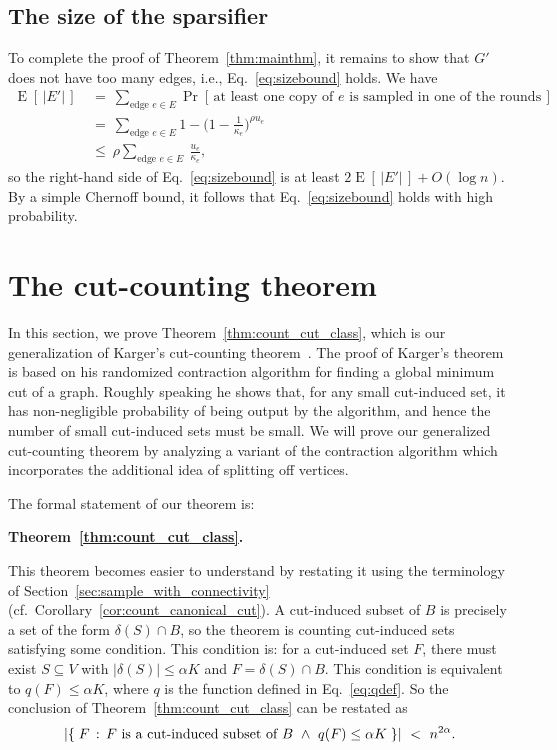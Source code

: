 \documentclass[11pt]{article}
\numberwithin{equation}{section}
\newcommand{\intersect}{\cap}
\newcommand{\abs}[1]{\lvert #1 \rvert}
\newcommand{\card}[1]{\abs{#1}}
\newcommand{\prob}[1]{\operatorname{Pr}\left[\,#1\,\right]}               \newcommand{\probg}[2]{\operatorname{Pr}\left[\,#1 \:\mid\: #2\,\right]}
\newcommand{\expect}[1]{\operatorname{E}\left[\,#1\,\right]}              \newcommand{\expectg}[2]{\operatorname{E}\left[\,#1 \,\mid\, #2\,\right]}
\newcommand{\Corollary}[1]{Corollary~\ref{cor:#1}}
\newcommand{\Equation}[1]{Eq.~\eqref{eq:#1}}
\newcommand{\SectionName}[1]{\label{sec:#1}}
\newcommand{\Section}[1]{Section~\ref{sec:#1}}
\newcommand{\Theorem}[1]{Theorem~\ref{thm:#1}}
\begin{document}
\subsection{The size of the sparsifier}

To complete the proof of \Theorem{mainthm},
it remains to show that $G'$ does not have too many edges,
i.e., \Equation{sizebound} holds.
We have
\begin{align*}
\expect{ \card{E'} }
    &~=~ \sum_{\text{edge } e \in E}
        \prob{ \text{at least one copy of $e$ is sampled in one of the rounds} } \\
    &~=~ \sum_{\text{edge } e \in E} 1 - \Big( 1 - \frac{1}{\kappa_e} \Big)^{\rho u_e} \\
    &~\leq~ \rho \sum_{\text{edge } e \in E} \: \frac{u_e}{\kappa_e},
\end{align*}
so the right-hand side of \Equation{sizebound} is at least $2 \expect{ \card{E'} } + O(\log n)$.
By a simple Chernoff bound, it follows that \Equation{sizebound} holds with high probability.




\section{The cut-counting theorem}
\SectionName{splitting_off_alg}

In this section, we prove \Theorem{count_cut_class}, which is our
generalization of Karger's cut-counting theorem~\cite{KargerContract,KargerStein}.
The proof of Karger's theorem is based on his randomized contraction algorithm for
finding a global minimum cut of a graph.
Roughly speaking he shows that, for any small cut-induced set, it has non-negligible probability
of being output by the algorithm, and hence the number of small cut-induced sets must be small.
We will prove our generalized cut-counting theorem by analyzing a variant of the contraction
algorithm which incorporates the additional idea of splitting off vertices.

The formal statement of our theorem is:

\medskip
\noindent\textbf{\Theorem{count_cut_class}.~}{\it \thmcountcutclass}

This theorem becomes easier to understand by restating it using the terminology of 
\Section{sample_with_connectivity} (cf.~\Corollary{count_canonical_cut}).
A cut-induced subset of $B$ is precisely a set of the form
$\delta(S) \intersect B$, so the theorem is counting cut-induced sets
satisfying some condition.
This condition is: for a cut-induced set $F$,
there must exist $S \subseteq V$ with $\card{\delta(S)} \leq \alpha K$
and $F = \delta(S) \intersect B$.
This condition is equivalent to $q(F) \leq \alpha K$,
where $q$ is the function defined in \Equation{qdef}.
So the conclusion of \Theorem{count_cut_class} can be restated as
$$
\card{ \setst{ F }{ F \text{\normalfont\ is a cut-induced subset of } B ~\wedge~ q(F) \leq \alpha K } }
~<~ n^{2\alpha}.
$$
\end{document}
